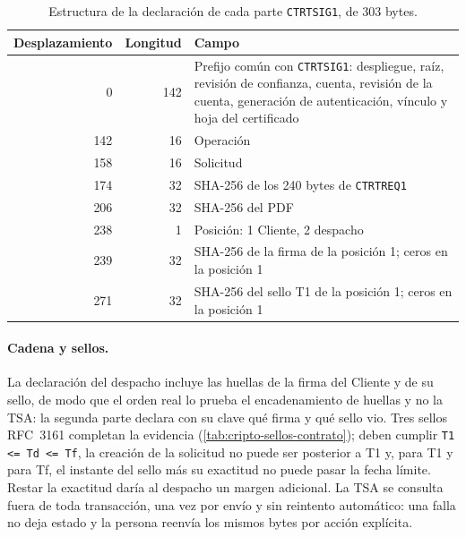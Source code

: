 \begin{table}[!htbp]
  \centering
  \caption{Estructura de la declaración de cada parte \texttt{CTRTSIG1}, de 303 bytes.}
  \label{tab:cripto-ctrtsig}
  
  \begin{tabularx}{\linewidth}{@{}r r X@{}}
    \toprule
    \textbf{Desplazamiento} & \textbf{Longitud} & \textbf{Campo} \\
    \midrule
    0 & 142 & Prefijo común con \texttt{CTRTSIG1}: despliegue, raíz, revisión de confianza, cuenta, revisión de la cuenta, generación de autenticación, vínculo y hoja del certificado \\
    142 & 16 & Operación \\
    158 & 16 & Solicitud \\
    174 & 32 & SHA-256 de los 240 bytes de \texttt{CTRTREQ1} \\
    206 & 32 & SHA-256 del PDF \\
    238 & 1 & Posición: 1 Cliente, 2 despacho \\
    239 & 32 & SHA-256 de la firma de la posición 1; ceros en la posición 1 \\
    271 & 32 & SHA-256 del sello T1 de la posición 1; ceros en la posición 1 \\
    \bottomrule
  \end{tabularx}
\end{table}

\paragraph{Cadena y sellos.} La declaración del despacho incluye las huellas
de la firma del Cliente y de su sello, de modo que el orden real lo prueba el
encadenamiento de huellas y no la TSA: la segunda parte declara con su clave
qué firma y qué sello vio. Tres sellos RFC~3161 completan la evidencia
(\cref{tab:cripto-sellos-contrato}); deben cumplir \texttt{T1 <= Td <= Tf}, la
creación de la solicitud no puede ser posterior a T1 y, para T1 y para Tf, el
instante del sello más su exactitud no puede pasar la fecha límite. Restar la
exactitud daría al despacho un margen adicional. La TSA se consulta fuera de
toda transacción, una vez por envío y sin reintento automático: una falla no
deja estado y la persona reenvía los mismos bytes por acción explícita.

